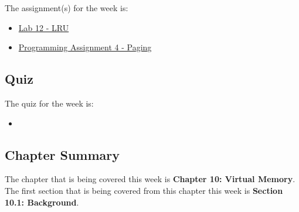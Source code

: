 The assignment(s) for the week is:

\begin{itemize}
    \item \href{https://github.com/cu-cspb-3753-fall-2024/lab-12-QuantumCompiler}{Lab 12 - LRU}
    \item \href{https://github.com/cu-cspb-3753-fall-2024/pa-paging-QuantumCompiler}{Programming Assignment 4 - Paging}
\end{itemize}

\subsection{Quiz}

The quiz for the week is:

\begin{itemize}
    \item {}
\end{itemize}

\newpage

\subsection{Chapter Summary}

The chapter that is being covered this week is \textbf{Chapter 10: Virtual Memory}. The first section that is being covered from this chapter this week is \textbf{Section 10.1: Background}.

